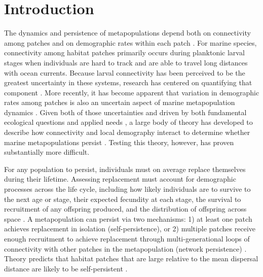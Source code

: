 \documentclass[12pt, oneside]{article}   	%
\begin{document}
\newpage{}

\section*{Introduction} 

The dynamics and persistence of metapopulations depend both on connectivity among patches and on demographic rates within each patch \citep{hastings_persistence_2006, hanski1998metapopulation}. For marine species, connectivity among habitat patches primarily occurs during planktonic larval stages when individuals are hard to track and are able to travel long distances with ocean currents. Because larval connectivity has been perceived to be the greatest uncertainty in these systems, research has centered on quantifying that component \citep[reviewed by][]{white2019connectivity}. More recently, it has become apparent that variation in demographic rates among patches is also an uncertain aspect of marine metapopulation dynamics \citep{hameed2016inverse, white2011oceanographic}. Given both of those uncertainties and driven by both fundamental ecological questions and applied needs \citep{botsford_dependence_2001,white_population_2010}, a large body of theory has developed to describe how connectivity and local demography interact to determine whether marine metapopulations persist \citep{burgess2014beyond, botsford2019population}. Testing this theory, however, has proven substantially more difficult.

For any population to persist, individuals must on average replace themselves during their lifetime. Assessing replacement must account for demographic processes across the life cycle, including how likely individuals are to survive to the next age or stage, their expected fecundity at each stage, the survival to recruitment of any offspring produced, and the distribution of offspring across space \citep{hastings_persistence_2006}. A metapopulation can persist via two mechanisms: 1) at least one patch achieves replacement in isolation (self-persistence), or 2) multiple patches receive enough recruitment to achieve replacement through multi-generational loops of connectivity with other patches in the metapopulation (network persistence) \citep{hastings_persistence_2006, burgess2014beyond}. Theory predicts that habitat patches that are large relative to the mean dispersal distance are likely to be self-persistent \citep{white_population_2010}. 
\end{document}
